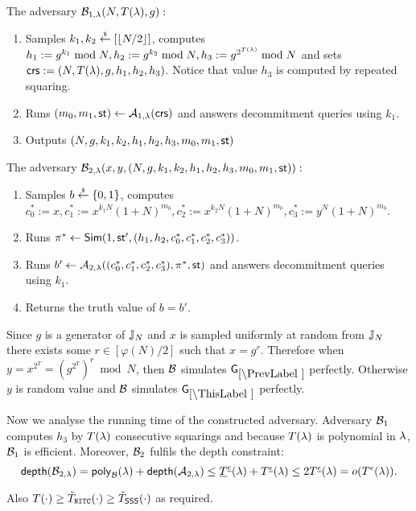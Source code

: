 The adversary $\mathcal{B}_{1,\lambda}(N, T(\lambda), g):$
\vspace{-2mm}
\begin{enumerate}
\item Samples $k_1, k_2 \stackrel{{\scriptscriptstyle\$}}{\leftarrow} [\left\lfloor N/2 \right\rfloor]$, computes $h_1 := g^{k_1} \bmod N, h_2 := g^{k_2} \bmod N, \allowbreak  h_3 := g^{2^{T(\lambda)}} \bmod N$ and sets $\mathsf{crs}:=(N, T(\lambda), g, h_1, h_2, h_3)$. Notice that value $h_3$ is computed by repeated squaring.
\item Runs $(m_0, m_1, \mathsf{st}) \leftarrow \mathcal{A}_{1, \lambda}(\mathsf{crs})$ and answers decommitment queries using $k_1$.
\item Outputs $(N,g,k_1, k_2, h_1,h_2,h_3, m_0, m_1, \mathsf{st})$
\end{enumerate}

The adversary $\mathcal{B}_{2,\lambda}(x,y,(N,g,k_1, k_2, h_1,h_2,h_3, m_0, m_1, \mathsf{st})):$
\vspace{-2mm}
\begin{enumerate}
\item Samples $b \stackrel{{\scriptscriptstyle\$}}{\leftarrow} \{0,1\}$, computes $c_0^*:=x, c_1^*:=x^{k_1N}(1+N)^{m_b}, c_2^*:=x^{k_2N}(1+N)^{m_b}, c_3^*:=y^{N}(1+N)^{m_b}$.
\item Runs $\pi^* \leftarrow \mathsf{Sim}(1, \mathsf{st}', (h_1, h_2, c_0^*, c_1^*, c_2^*, c_3^*))$.
\item Runs $b' \leftarrow \mathcal{A}_{2, \lambda}((c_0^*, c_1^*, c_2^*, c_3^*), \pi^*, \mathsf{st})$ and answers decommitment queries using $k_1$.
\item Returns the truth value of $b=b'$.
\end{enumerate}
Since $g$ is a generator of $\mathbb{J}_N$ and $x$ is sampled uniformly at random from $\mathbb{J}_N$ there exists some $r \in [\varphi(N)/2]$ such that $x = g^{r}$. Therefore when $y = x^{2^T} = (g^{2^T})^{r} \bmod N$, then $\mathcal{B}$ simulates $\games_\prevgame$ perfectly. Otherwise $y$ is random value and $\mathcal{B}$ simulates $\games_\thisgame$ perfectly. 

Now we analyse the running time of the constructed adversary. Adversary $\mathcal{B}_1$ computes $h_3$ by $T(\lambda)$ consecutive squarings and because $T(\lambda)$ is polynomial in $\lambda$, $\mathcal{B}_1$ is efficient. Moreover, $\mathcal{B}_2$ fulfils the depth constraint:
\[ \mathsf{depth}(\mathcal{B}_{2,\lambda}) = \mathsf{poly}_{\mathcal{B}}(\lambda) + \mathsf{depth}(\mathcal{A}_{2,\lambda}) \leq \underline{T}^{\underline{\epsilon}}(\lambda) + T^{\underline{\epsilon}}(\lambda) \leq 2 T^{\underline{\epsilon}}(\lambda) = o(T^{\epsilon}(\lambda)). \] 

Also $T(\cdot) \geq \tilde{T}_{\mathtt{NITC}}(\cdot) \geq \tilde{T}_\mathsf{SSS}(\cdot)$ as required.

%




